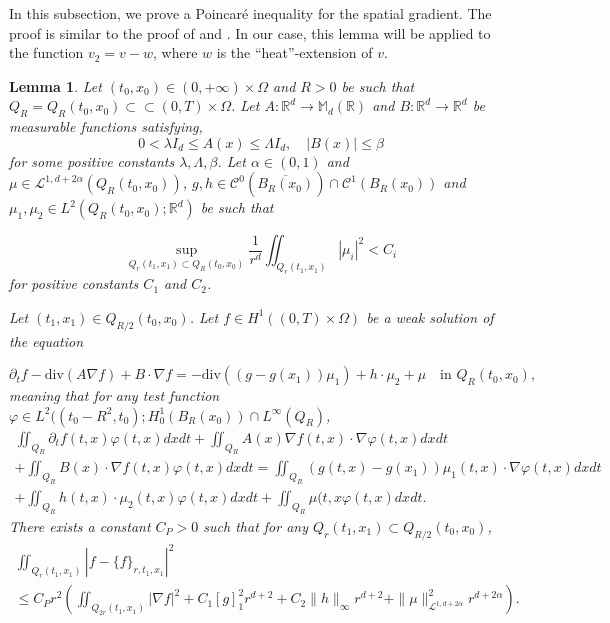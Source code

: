 \documentclass[reqno,12pt,twoside]{amsart}
\newtheorem{lemma}{Lemma}[section]
\numberwithin{equation}{section} \numberwithin{theorem}{section}
\numberwithin{proposition}{section} \numberwithin{lemma}{section}
\numberwithin{corollary}{section}
\numberwithin{definition}{section} \numberwithin{remark}{section}
\begin{document}
In this subsection, we prove a Poincaré inequality for the spatial gradient. The proof is similar to the proof of \cite[Lemma 2.6]{Yin_1997} and \cite[Lemma 4]{S81}. In our case, this lemma will be applied to the function $v_2 = v-w$, where $w$ is the ``heat''-extension of $v$. 

\begin{lemma}\label{prop : Poincare}
Let $(t_0, x_0)\in (0,+\infty) \times \Omega$ and $R >0$ be such that $Q_R = Q_R(t_0,x_0) \subset \subset (0,T) \times \Omega$. Let $A : \mathbb{R}^d  \rightarrow \mathbb{M}_d(\mathbb{R})$ and $B : \mathbb{R}^d \rightarrow \mathbb{R}^d$ be measurable functions satisfying, 
\[0< \lambda I_d \leqslant A(x) \leqslant \Lambda I_d, \quad |B(x)| \leqslant \beta\]
for some positive constants $\lambda, \Lambda, \beta$. Let $\alpha \in (0,1)$ and $\mu \in \mathcal{L}^{1, d+2\alpha}(Q_R(t_0,x_0))$, $g,h\in \mathcal{C}^0(\overline{B_R(x_0)})\cap \mathcal{C}^1(B_R(x_0))$ and $\mu_1, \mu_2 \in L^2(Q_R(t_0,x_0);\mathbb{R}^d)$ be such that 

\begin{equation}\label{cond mui}
\sup_{Q_r(t_1,x_1) \subset Q_R(t_0,x_0)} \frac{1}{r^d} \iint_{Q_r(t_1, x_1)} |\mu_i|^2 < C_i
\end{equation}
for positive constants $C_1$ and $C_2$. 

Let $(t_1,x_1)\in Q_{R/2}(t_0,x_0)$. 
Let $f\in H^1((0,T)\times \Omega)$ be a weak solution of the equation 

\[\partial_t f - \text{div}(A\nabla f) + B\cdot\nabla f = -\text{div}((g-g(x_1)) \mu_1)+ h\cdot \mu_2 + \mu \quad \text{in } Q_R(t_0,x_0),\]
meaning that for any test function $\varphi\in L^2((t_0-R^2, t_0);H_0^1(B_R(x_0)) \cap L^\infty(Q_R)$,
\begin{multline}\label{eq poincare}
\iint_{Q_R} \partial_t f(t,x) \varphi(t,x) dxdt + \iint_{Q_R}A(x)\nabla f(t,x)\cdot \nabla \varphi(t,x) dxdt\\ + \iint_{Q_R}B(x)\cdot\nabla f(t,x) \varphi(t,x) dxdt
= \iint_{Q_R} (g(t,x)-g(x_1))\mu_1(t,x)\cdot \nabla \varphi(t,x) dxdt\\
 +\iint_{Q_R} h(t,x)\cdot \mu_2(t,x)\varphi(t,x) dxdt + \iint_{Q_R} \mu(t,x\varphi(t,x) dxdt.  
\end{multline}
There exists a constant $C_P > 0$ such that for any  $Q_r(t_1, x_1) \subset Q_{R/2}(t_0, x_0)$, 
\begin{multline*}
\iint_{Q_r(t_1, x_1)} |f-\{f\}_{r,t_1,x_1}|^2\\
\leqslant C_P r^2\left(\iint_{Q_{2r}(t_1, x_1)} |\nabla f|^2 + C_1 [g]_1^2 r^{d+2} +C_2\|h\|_\infty r^{d+2} + \|\mu\|^2_{\mathcal{L}^{1,d+2\alpha}} r^{d+2\alpha}\right).
\end{multline*}
\end{lemma}
\end{document}
